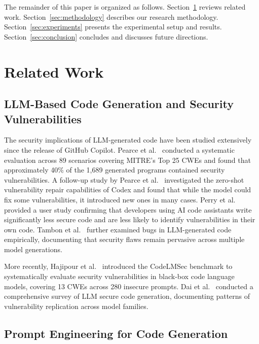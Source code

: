 \documentclass[runningheads]{llncs}
\begin{document}
The remainder of this paper is organized as follows. Section~\ref{sec:related} reviews related work. Section~\ref{sec:methodology} describes our research methodology. Section~\ref{sec:experiments} presents the experimental setup and results. Section~\ref{sec:conclusion} concludes and discusses future directions.

\section{Related Work}
\label{sec:related}

\subsection{LLM-Based Code Generation and Security Vulnerabilities}

The security implications of LLM-generated code have been studied extensively since the release of GitHub Copilot. Pearce et al.~\cite{pearce2022asleep} conducted a systematic evaluation across 89 scenarios covering MITRE's Top 25 CWEs and found that approximately 40\% of the 1,689 generated programs contained security vulnerabilities. A follow-up study by Pearce et al.~\cite{pearce2022zeroshot} investigated the zero-shot vulnerability repair capabilities of Codex and found that while the model could fix some vulnerabilities, it introduced new ones in many cases. Perry et al.~\cite{perry2023users} provided a user study confirming that developers using AI code assistants write significantly less secure code and are less likely to identify vulnerabilities in their own code. Tambon et al.~\cite{tambon2024bugs} further examined bugs in LLM-generated code empirically, documenting that security flaws remain pervasive across multiple model generations.

More recently, Hajipour et al.~\cite{hajipour2024codelmsec} introduced the CodeLMSec benchmark to systematically evaluate security vulnerabilities in black-box code language models, covering 13 CWEs across 280 insecure prompts. Dai et al.~\cite{dai2025comprehensive} conducted a comprehensive survey of LLM secure code generation, documenting patterns of vulnerability replication across model families.

\subsection{Prompt Engineering for Code Generation}
\end{document}
